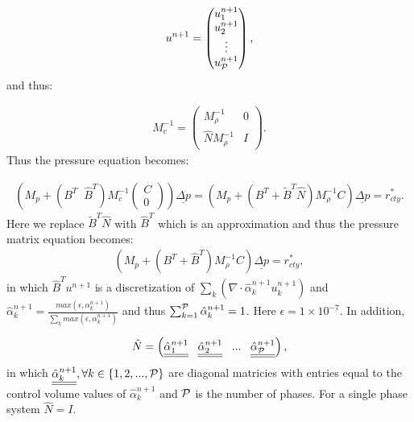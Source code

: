 \begin{eqnarray}
u^{n+1}= 
\begin{pmatrix}
u^{n+1}_1 \\ u^{n+1}_2 \\ \vdots \\ u^{n+1}_{\cal P}
\end{pmatrix}  , 
\end{eqnarray}
and thus:

\begin{eqnarray}
M_c^{-1}=
\begin{pmatrix}
M_\rho^{-1}  & 0 \\ 
\hat N M_\rho^{-1}   & I 
\end{pmatrix}  . 
\end{eqnarray}
Thus the pressure equation becomes:

\begin{eqnarray}
\left( M_p + (B^T \;\; \hat B^T) { M}_c^{-1} 
\begin{pmatrix}
 C \\ 0  
\end{pmatrix}  \right) 
\underline{\Delta p} 
= 
\left( M_p +(B^T+ \tilde B^T \hat N) M_{\rho}^{-1} C \right) \underline{\Delta p}= {r}_{cty}^*  .
\label{delt-p-classic27-phase}
\end{eqnarray} 
Here we replace $\tilde B^T \hat N$ with $\hat B^T$ which is an approximation and thus the 
pressure matrix equation becomes:
\begin{eqnarray}
\left( M_p +(B^T+ \hat B^T) M_{\rho}^{-1} C \right) \underline{\Delta p}= {r}_{cty}^{*} ,
\label{delt-p-classic27-phase}
\end{eqnarray} 
in which $\hat B^T u^{n+1}$ is a discretization of $\sum_k ( \nabla\cdot \hat\alpha_k^{n+1} u_k^{n+1} )$ 
and $\hat\alpha_k^{n+1} =\frac{max( \epsilon, \alpha_k^{n+1}) } {\sum_k max( \epsilon, \alpha_k^{n+1}) }$ 
and thus $\sum_{k=1}^{\cal P} \hat\alpha_k^{n+1} =1$. 
Here $\epsilon=1\times 10^{-7}$. In addition, 

\begin{eqnarray}
\hat N = \left( \underline{\underline{\hat\alpha_1^{n+1}}} \;\;\; \underline{\underline{\hat\alpha_2^{n+1}} } \;\;\;... \;\;\;  \underline{\underline{\hat\alpha_{\cal P}^{n+1}} }  \right) , 
\end{eqnarray} 
in which $ \underline{\underline{\hat\alpha_k^{n+1}}}, \forall k\in\{1,2,...,{\cal P}\} $ 
are diagonal matricies with entries equal to the control volume values of   ${\hat\alpha_k^{n+1}} $ 
and $\cal P$ is the number of phases. For a single phase system $\hat N = I$.



